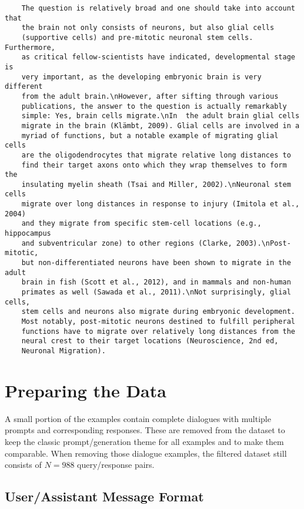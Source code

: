 \begin{verbatim}
    The question is relatively broad and one should take into account that 
    the brain not only consists of neurons, but also glial cells 
    (supportive cells) and pre-mitotic neuronal stem cells. Furthermore,
    as critical fellow-scientists have indicated, developmental stage is
    very important, as the developing embryonic brain is very different 
    from the adult brain.\nHowever, after sifting through various 
    publications, the answer to the question is actually remarkably 
    simple: Yes, brain cells migrate.\nIn  the adult brain glial cells
    migrate in the brain (Klämbt, 2009). Glial cells are involved in a
    myriad of functions, but a notable example of migrating glial cells
    are the oligodendrocytes that migrate relative long distances to 
    find their target axons onto which they wrap themselves to form the
    insulating myelin sheath (Tsai and Miller, 2002).\nNeuronal stem cells
    migrate over long distances in response to injury (Imitola et al., 2004)
    and they migrate from specific stem-cell locations (e.g., hippocampus 
    and subventricular zone) to other regions (Clarke, 2003).\nPost-mitotic,
    but non-differentiated neurons have been shown to migrate in the adult 
    brain in fish (Scott et al., 2012), and in mammals and non-human 
    primates as well (Sawada et al., 2011).\nNot surprisingly, glial cells, 
    stem cells and neurons also migrate during embryonic development. 
    Most notably, post-mitotic neurons destined to fulfill peripheral 
    functions have to migrate over relatively long distances from the 
    neural crest to their target locations (Neuroscience, 2nd ed, 
    Neuronal Migration).
\end{verbatim}

\section{Preparing the Data}
A small portion of the examples contain complete dialogues with multiple prompts and corresponding responses. These are removed from the dataset to keep the classic prompt/generation theme for all examples and to make them comparable. When removing those dialogue examples, the filtered dataset still consists of $N = 988$ query/response pairs.

\subsection{User/Assistant Message Format}\label{subsec:message_format}
